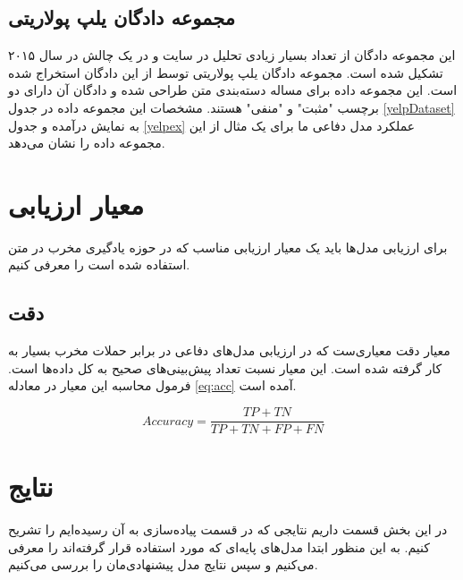 \subsection{مجموعه دادگان یلپ پولاریتی}
این مجموعه دادگان از تعداد بسیار زیادی تحلیل در سایت  و در یک چالش در سال ۲۰۱۵ تشکیل شده است. مجموعه دادگان یلپ پولاریتی توسط \cite{agnewsdata} از این دادگان استخراج شده است. این مجموعه داده برای مساله دسته‌بندی متن طراحی شده و دادگان آن دارای دو برچسب "مثبت" و "منفی" هستند. مشخصات این مجموعه داده در جدول \ref{yelpDataset} به نمایش درآمده و جدول \ref{yelpex} عملکرد مدل دفاعی ما برای یک مثال از این مجموعه داده را نشان می‌دهد.


\section{معیار ارزیابی}
برای ارزیابی مدل‌ها باید یک معیار ارزیابی مناسب که در حوزه یادگیری مخرب در متن استفاده شده است را معرفی کنیم.
\subsection{دقت}
معیار دقت معیاری‌ست که در ارزیابی مدل‌های دفاعی در برابر حملات مخرب بسیار به کار گرفته شده است. این معیار نسبت تعداد پیش‌بینی‌های صحیح به کل داده‌ها است. فرمول محاسبه این معیار در معادله \ref{eq:acc} آمده است.

\begin{equation} \label{eq:acc}
	Accuracy = \frac{TP + TN}{TP + TN + FP + FN}
\end{equation}
 
\section{نتایج}
در این بخش قسمت داریم نتایجی که در قسمت پیاده‌سازی به آن رسیده‌ایم را تشریح کنیم. به این منظور ابتدا مدل‌های پایه‌ای که مورد استفاده قرار گرفته‌اند را معرفی می‌کنیم و سپس نتایج مدل پیشنهادی‌مان را بررسی می‌کنیم.
